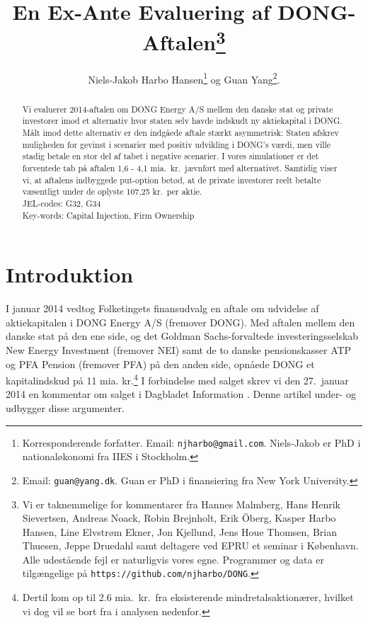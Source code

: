\documentclass{article}
\title{En Ex-Ante Evaluering af DONG-Aftalen\thanks{Vi er taknemmelige for kommentarer fra Hannes Malmberg, Hans Henrik Sievertsen, Andreas Noack, Robin Brejnholt, Erik {\"O}berg, Kasper Harbo Hansen, Line Elvstrøm Ekner, Jon Kjellund,  Jens Houe Thomsen, Brian Thuesen, Jeppe Druedahl samt deltagere ved EPRU et seminar i København. Alle udestående fejl er naturligvis vores egne.  Programmer og data er tilgængelige på \texttt{https://github.com/njharbo/DONG}.} \\ }
\author{Niels-Jakob Harbo Hansen\thanks{Korresponderende forfatter. Email: \texttt{njharbo@gmail.com}. Niels-Jakob er PhD i nationaløkonomi fra IIES i Stockholm.} \hspace{0.1 mm} og Guan Yang\thanks{Email: \texttt{guan@yang.dk}. Guan er PhD i finansiering fra New York University.  }. }
\begin{document}
\maketitle

\begin{abstract}
\onehalfspacing
Vi evaluerer 2014-aftalen om DONG Energy A/S mellem den danske stat og private investorer imod et alternativ hvor staten selv havde indskudt ny aktiekapital i DONG. Målt imod dette alternativ er den indgåede aftale stærkt asymmetrisk: Staten afskrev muligheden for gevinst i scenarier med positiv udvikling i DONG's værdi, men ville stadig betale en stor del af tabet i negative scenarier. I vores simulationer er det forventede tab på aftalen 1,6 - 4,1 mia.\ kr.\ jævnført med alternativet. Samtidig viser vi, at aftalens indbyggede put-option betød, at de private investorer reelt betalte væsentligt under de oplyste 107,25 kr.\ per aktie. \\
 JEL-codes: G32, G34 \\
 Key-words: Capital Injection, Firm Ownership
\end{abstract}


\newpage

\section{Introduktion}


I januar 2014 vedtog Folketingets finansudvalg en aftale om udvidelse af aktiekapitalen i DONG Energy A/S (fremover DONG). Med aftalen mellem den danske stat på den ene side, og det Goldman Sachs-forvaltede investeringsselskab New Energy Investment (fremover NEI) samt de to danske pensionskasser ATP og PFA Pension (fremover PFA) på den anden side, opnåede DONG et kapitalindskud på 11 mia. kr.\footnote{Dertil kom op til 2.6 mia.\ kr.\ fra eksisterende mindretalsaktionærer, hvilket vi dog vil se bort fra i analysen nedenfor.} I forbindelse med salget skrev vi den 27.\ januar 2014 en kommentar om salget i Dagbladet Information \citep{Hansen2014}. Denne artikel under- og udbygger  disse argumenter.
\end{document}
